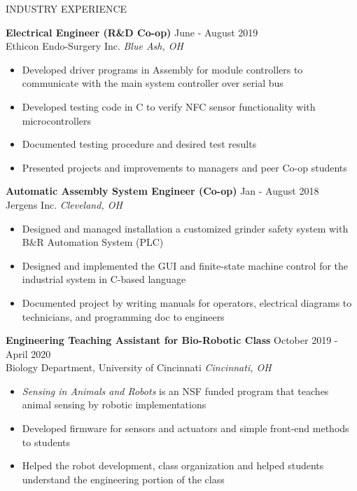 \documentclass{../lib/resume} %
\begin{document}
    \begin{rSection}{INDUSTRY EXPERIENCE}

        \textbf{Electrical Engineer (R\&D Co-op)} \hfill June - August 2019\\
        Ethicon Endo-Surgery Inc. \hfill \textit{Blue Ash, OH}
        \begin{itemize}
            \itemsep -4pt {}
            \item Developed driver programs in Assembly for module controllers to communicate with the main system controller over serial bus
            \item Developed testing code in C to verify NFC sensor functionality with microcontrollers
            \item Documented testing procedure and desired test results
            \item Presented projects and improvements to managers and peer Co-op students
        \end{itemize}

        \textbf{Automatic Assembly System Engineer (Co-op)} \hfill Jan - August 2018
        \\	Jergens Inc. \hfill \textit{Cleveland, OH}
        \begin{itemize}
            \itemsep -4pt {}
            \item Designed and managed installation a customized grinder safety system with B\&R Automation System (PLC)
            \item Designed and implemented the GUI and finite-state machine control for the industrial system in C-based language
            \item Documented project by writing manuals for operators, electrical diagrams to technicians, and programming doc to engineers
        \end{itemize}


        \textbf{Engineering Teaching Assistant for Bio-Robotic Class} \hfill October 2019 - April 2020\\
        Biology Department, University of Cincinnati \hfill \textit{Cincinnati, OH}
        \begin{itemize}
            \itemsep -4pt {}
            \item \textit{Sensing in Animals and Robots} is an NSF funded program that teaches animal sensing by robotic implementations
            \item Developed firmware for sensors and actuators and simple front-end methods to students
            \item Helped the robot development, class organization and helped students understand the engineering portion of the class

        \end{itemize}
    \end{rSection}
\end{document}
